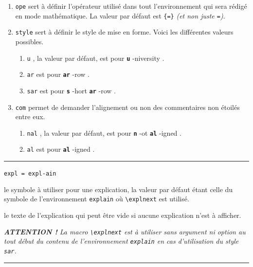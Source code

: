 \documentclass[12pt,a4paper]{book}
\newcommand\env[1]{\texttt{#1}}
\newcommand\macro[1]{\env{\textbackslash{}#1}}
\theoremstyle{definition}
\newcommand\separation{
	\medskip
	\hfill\rule{0.5\textwidth}{0.75pt}\hfill
	\medskip
}
\newcommand\whyprefix[2]{%
	\textbf{\prefix{#1}}-#2%
}
\newcommand\mwhyprefix[2]{%
	\texttt{#1 = #1-#2}%
}
\newcommand\prefix[1]{%
	\texttt{#1}%
}
\begin{document}
{{\begin{enumerate}
	\item \verb+ope+ sert à définir l'opérateur utilisé dans tout l'environnement qui sera rédigé en mode mathématique. 
	      La valeur par défaut est \verb+{=}+ \emph{(et non juste \texttt{=})}.

	\item \verb+style+ sert à définir le style de mise en forme. Voici les différentes valeurs possibles.
	      \begin{enumerate}
	      		\item \prefix{u}, la valeur par défaut, est pour \whyprefix{u}{niversity}.

	      		\item \prefix{ar} est pour \whyprefix{ar}{row}.

	      		\item \prefix{sar} est pour \whyprefix{s}{hort} \whyprefix{ar}{row}.
	      \end{enumerate}

	\item \verb+com+ permet de demander l'alignement ou non des commentaires non étoilés entre eux.
	      \begin{enumerate}
	      		\item \prefix{nal}, la valeur par défaut, est pour \whyprefix{n}{ot} \whyprefix{al}{igned}.

	      		\item \prefix{al} est pour \whyprefix{al}{igned}.

	      \end{enumerate}
\end{enumerate}


\separation


  \hfill \mwhyprefix{expl}{ain}

\IDoption{} le symbole à utiliser pour une explication, la valeur par défaut étant celle du symbole de l'environnement \env{explain} où \macro{explnext} est utilisé.

\IDarg{} le texte de l'explication qui peut être vide si aucune explication n'est à afficher.

\medskip

\medskip

\emph{\textbf{ATTENTION !} La macro \macro{explnext} est à utiliser sans argument ni option au tout début du contenu de l'environnement \env{explain} en cas d'utilisation du style \texttt{sar}.}


\separation


}}
\end{document}
